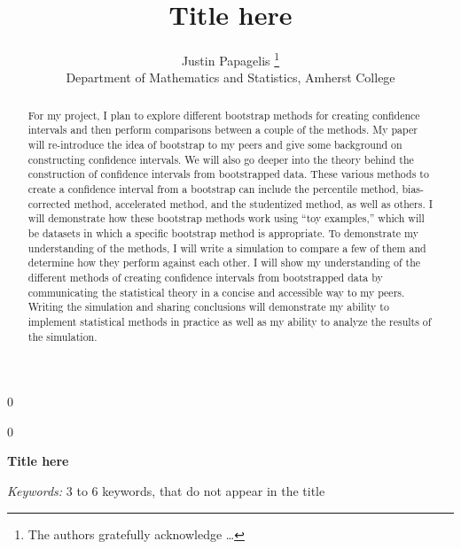 \documentclass[12pt]{article}
\newcommand{\blind}{0}
\begin{document}
\def\spacingset#1{\renewcommand{\baselinestretch}%
{#1}\small\normalsize} \spacingset{1}



\blind
{
  \title{\bf Title here}

  \author{
        Justin Papagelis \thanks{The authors gratefully acknowledge
\ldots{}} \\
    Department of Mathematics and Statistics, Amherst College\\
      }
  \maketitle
} \fi

\blind
{
  \bigskip
  \bigskip
  \bigskip
  \begin{center}
    {\LARGE\bf Title here}
  \end{center}
  \medskip
} \fi

\bigskip
\begin{abstract}
For my project, I plan to explore different bootstrap methods for
creating confidence intervals and then perform comparisons between a
couple of the methods. My paper will re-introduce the idea of bootstrap
to my peers and give some background on constructing confidence
intervals. We will also go deeper into the theory behind the
construction of confidence intervals from bootstrapped data. These
various methods to create a confidence interval from a bootstrap can
include the percentile method, bias-corrected method, accelerated
method, and the studentized method, as well as others. I will
demonstrate how these bootstrap methods work using ``toy examples,''
which will be datasets in which a specific bootstrap method is
appropriate. To demonstrate my understanding of the methods, I will
write a simulation to compare a few of them and determine how they
perform against each other. I will show my understanding of the
different methods of creating confidence intervals from bootstrapped
data by communicating the statistical theory in a concise and accessible
way to my peers. Writing the simulation and sharing conclusions will
demonstrate my ability to implement statistical methods in practice as
well as my ability to analyze the results of the simulation.
\end{abstract}

\noindent%
{\it Keywords:} 3 to 6 keywords, that do not appear in the title
\vfill

\newpage
\spacingset{1.45} %
\end{document}

